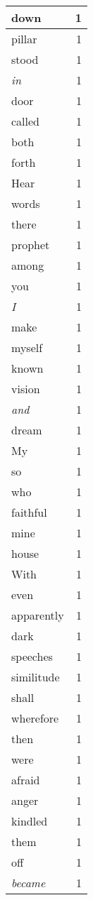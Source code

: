 \begin{center}
\begin{longtable}{l|r}
down & 1 \\ \hline
pillar & 1 \\ \hline
stood & 1 \\ \hline
\emph{in} & 1 \\ \hline
door & 1 \\ \hline
called & 1 \\ \hline
both & 1 \\ \hline
forth & 1 \\ \hline
Hear & 1 \\ \hline
words & 1 \\ \hline
there & 1 \\ \hline
prophet & 1 \\ \hline
among & 1 \\ \hline
you & 1 \\ \hline
\emph{I} & 1 \\ \hline
make & 1 \\ \hline
myself & 1 \\ \hline
known & 1 \\ \hline
vision & 1 \\ \hline
\emph{and} & 1 \\ \hline
dream & 1 \\ \hline
My & 1 \\ \hline
so & 1 \\ \hline
who & 1 \\ \hline
faithful & 1 \\ \hline
mine & 1 \\ \hline
house & 1 \\ \hline
With & 1 \\ \hline
even & 1 \\ \hline
apparently & 1 \\ \hline
dark & 1 \\ \hline
speeches & 1 \\ \hline
similitude & 1 \\ \hline
shall & 1 \\ \hline
wherefore & 1 \\ \hline
then & 1 \\ \hline
were & 1 \\ \hline
afraid & 1 \\ \hline
anger & 1 \\ \hline
kindled & 1 \\ \hline
them & 1 \\ \hline
off & 1 \\ \hline
\emph{became} & 1 \\ \hline

\end{longtable}
\end{center}
